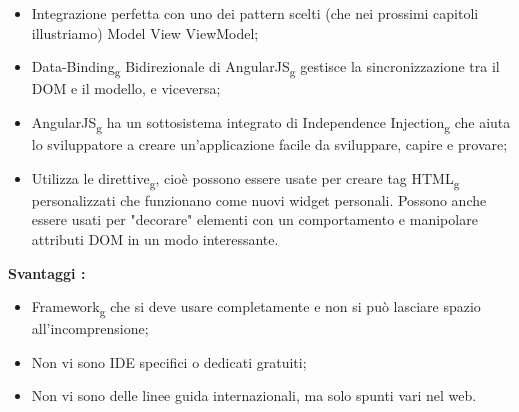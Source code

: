 {{{\begin{itemize}
				\item Integrazione perfetta con uno dei pattern scelti (che nei prossimi capitoli illustriamo) Model View ViewModel;
				\item Data-Binding\textsubscript{g} Bidirezionale di AngularJS\textsubscript{g} gestisce la sincronizzazione tra il DOM e il modello, e viceversa;
				\item AngularJS\textsubscript{g} ha un sottosistema integrato di Independence Injection\textsubscript{g} che aiuta lo sviluppatore a creare un'applicazione facile da sviluppare, capire e provare; 
				\item Utilizza le direttive\textsubscript{g}, cioè possono essere usate per creare tag HTML\textsubscript{g} personalizzati che funzionano come nuovi widget personali. Possono anche essere usati per "decorare" elementi con un comportamento e manipolare attributi DOM in un modo interessante.
			\end{itemize}
			\textbf{Svantaggi :}
			\begin{itemize}\itemsep1pt
				\item Framework\textsubscript{g} che si deve usare completamente e non si può lasciare spazio all'incomprensione;
				\item Non vi sono IDE specifici o dedicati gratuiti;
				\item Non vi sono delle linee guida internazionali, ma solo spunti vari nel web.
			\end{itemize}
		}
}}
